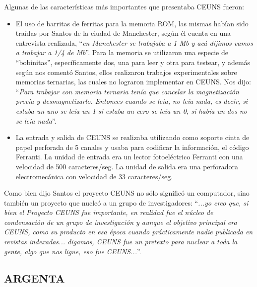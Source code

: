\documentclass[%
  	final,
%
	notitlepage,
	narroweqnarray,
	inline,
 	twoside,
	]{ieee}
\begin{document}
Algunas de las caracter\'isticas m\'as importantes que presentaba CEUNS fueron:\\

\begin{itemize}

\item El uso de barritas de ferritas para la memoria ROM, las mismas hab\'ian sido tra\'idas por Santos de la ciudad de Manchester, seg\'un \'el cuenta en una entrevista\cite{santos} realizada, ``\textit{en Manchester se trabajaba a 1 Mb y ac\'a dijimos vamos a trabajar a 1/4 de Mb}''. Para la memoria se utilizaron una especie de ``bobinitas'', espec\'ificamente dos, una para leer y otra para testear, y adem\'as seg\'un nos coment\'o Santos, ellos realizaron trabajos experimentales sobre memorias ternarias, las cuales no lograron implementar en CEUNS. Nos dijo: ``\textit{Para trabajar con memoria ternaria ten\'ia que cancelar la magnetizaci\'on previa y desmagnetizarlo. Entonces cuando se le\'ia, no le\'ia nada, es decir, si estaba un uno se le\'ia un 1 si estaba un cero se le\'ia un 0, si hab\'ia un dos no se le\'ia nada}''.\\

\item La entrada y salida de CEUNS se realizaba utilizando como soporte cinta de papel perforada de 5 canales y usaba para codificar la informaci\'on, el c\'odigo Ferranti. La unidad de entrada era un lector fotoel\'ectrico Ferranti con una velocidad de 500 caracteres/seg. La unidad de salida era una perforadora electromec\'anica con velocidad de 33 caracteres/seg.\\

\end{itemize}

Como bien dijo Santos el proyecto CEUNS no s\'olo signific\'o un computador, sino tambi\'en un proyecto que nucle\'o a un grupo de investigadores:
``\textit{...yo creo que, si bien el Proyecto CEUNS fue importante, en realidad fue el n\'ucleo de condensaci\'on de un grupo de investigaci\'on y aunque el objetivo principal era CEUNS, como su producto en esa \'epoca cuando pr\'acticamente nadie publicada en revistas indexadas... digamos, CEUNS fue un pretexto para nuclear a toda la gente, algo que nos ligue, eso fue CEUNS...}''.

\subsection*{ARGENTA}
\end{document}
